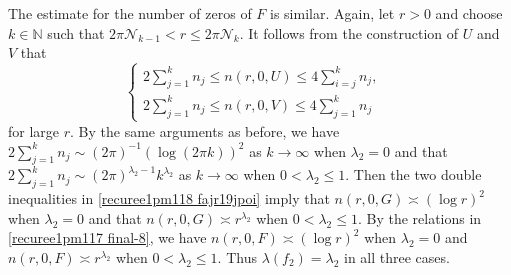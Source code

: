 \documentclass[12pt]{amsart}
\numberwithin{equation}{section}
\begin{document}
The estimate for the number of zeros of $F$ is similar. Again, let $r>0$ and choose $k\in \mathbb{N}$ such that $2\pi\mathcal{N}_{k-1} <r \leq 2\pi \mathcal{N}_k$. It follows from the construction of $U$ and $V$ that
\begin{equation}\label{recuree1pm118  fajr19jpoi}
\left\{
\begin{array}{ll}
2\sum_{j=1}^{k}n_j\leq n(r,0,U)\leq 4\sum_{i=j}^{k}n_j, &\\
2\sum_{j=1}^{k}n_j\leq n(r,0,V)\leq 4\sum_{j=1}^{k}n_j &
\end{array}
\right.
\end{equation}
for large $r$. By the same arguments as before, we have $2\sum_{j=1}^{k}n_j \sim (2\pi)^{-1} (\log (2\pi k))^2$ as $k\to\infty$ when $\lambda_2=0$ and that $2\sum_{j=1}^{k}n_j \sim (2\pi)^{\lambda_2-1} k^{\lambda_2}$ as $k\to\infty$ when $0<\lambda_2\leq 1$. Then the two double inequalities in \eqref{recuree1pm118  fajr19jpoi} imply that $n(r,0,G)\asymp (\log r)^2$ when $\lambda_2=0$ and that $n(r,0,G)\asymp r^{\lambda_2}$ when $0<\lambda_2\leq 1$. By the relations in \eqref{recuree1pm117 final-8}, we have $n(r,0,F)\asymp (\log r)^2$ when $\lambda_2=0$ and $n(r,0,F)\asymp r^{\lambda_2}$ when $0<\lambda_2\leq 1$. Thus $\lambda(f_2)=\lambda_2$ in all three cases.
\end{document}
